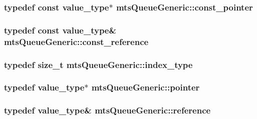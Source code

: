 \subsubsection[{const\+\_\+pointer}]{\setlength{\rightskip}{0pt plus 5cm}typedef const {\bf value\+\_\+type}$\ast$ {\bf mts\+Queue\+Generic\+::const\+\_\+pointer}}\label{classmts_queue_generic_a9b295370295fe53fee2f04a2ebd929b8}
\hypertarget{classmts_queue_generic_ad133c14265ada42f3347b90ccdd28cd3}{}
\subsubsection[{const\+\_\+reference}]{\setlength{\rightskip}{0pt plus 5cm}typedef const {\bf value\+\_\+type}\& {\bf mts\+Queue\+Generic\+::const\+\_\+reference}}\label{classmts_queue_generic_ad133c14265ada42f3347b90ccdd28cd3}
\hypertarget{classmts_queue_generic_a7ff0edcb4cb9771a7085933f2bf022ed}{}
\subsubsection[{index\+\_\+type}]{\setlength{\rightskip}{0pt plus 5cm}typedef size\+\_\+t {\bf mts\+Queue\+Generic\+::index\+\_\+type}}\label{classmts_queue_generic_a7ff0edcb4cb9771a7085933f2bf022ed}
\hypertarget{classmts_queue_generic_aa3ad46661cfdf9f182fd9c32315930a5}{}
\subsubsection[{pointer}]{\setlength{\rightskip}{0pt plus 5cm}typedef {\bf value\+\_\+type}$\ast$ {\bf mts\+Queue\+Generic\+::pointer}}\label{classmts_queue_generic_aa3ad46661cfdf9f182fd9c32315930a5}
\hypertarget{classmts_queue_generic_ad4bf20418b4e749013c67b75d4b82aba}{}
\subsubsection[{reference}]{\setlength{\rightskip}{0pt plus 5cm}typedef {\bf value\+\_\+type}\& {\bf mts\+Queue\+Generic\+::reference}}\label{classmts_queue_generic_ad4bf20418b4e749013c67b75d4b82aba}
\hypertarget{classmts_queue_generic_a3812ba15591f4a89a9df272391739e6f}{}
